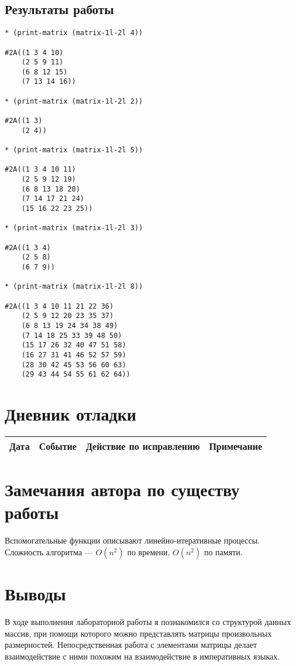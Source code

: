\documentclass[12pt]{article}
\begin{document}
\subsection{Результаты работы}
\begin{lstlisting}
* (print-matrix (matrix-1l-2l 4))

#2A((1 3 4 10)
    (2 5 9 11)
    (6 8 12 15)
    (7 13 14 16))

* (print-matrix (matrix-1l-2l 2))

#2A((1 3)
    (2 4))

* (print-matrix (matrix-1l-2l 5))

#2A((1 3 4 10 11)
    (2 5 9 12 19)
    (6 8 13 18 20)
    (7 14 17 21 24)
    (15 16 22 23 25))

* (print-matrix (matrix-1l-2l 3))

#2A((1 3 4)
    (2 5 8)
    (6 7 9))

* (print-matrix (matrix-1l-2l 8))

#2A((1 3 4 10 11 21 22 36)
    (2 5 9 12 20 23 35 37)
    (6 8 13 19 24 34 38 49)
    (7 14 18 25 33 39 48 50)
    (15 17 26 32 40 47 51 58)
    (16 27 31 41 46 52 57 59)
    (28 30 42 45 53 56 60 63)
    (29 43 44 54 55 61 62 64))
\end{lstlisting}

\section{Дневник отладки}
\begin{tabular}{|c|c|c|c|}
\hline
Дата & Событие & Действие по исправлению & Примечание \\
\hline
\end{tabular}

\section{Замечания автора по существу работы}
Вспомогательные функции описывают линейно-итеративные процессы. Сложность алгоритма --- $O(n^2)$ по времени, $O(n^2)$ по памяти.

\section{Выводы}
В ходе выполнения лабораторной работы я познакомился со структурой данных массив, при помощи которого можно представлять матрицы произвольных размерностей. Непосредственная работа с элементами матрицы делает взаимодействие с ними похожим на взаимодействие в императивных языках.
\end{document}
